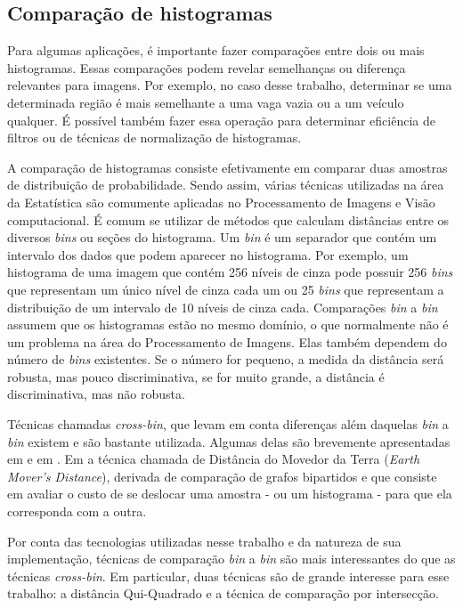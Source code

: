     \subsection{Comparação de histogramas} \label{comparacaoHistogramas}

        Para algumas aplicações, é importante fazer comparações entre dois ou mais histogramas. Essas comparações podem revelar semelhanças ou diferença relevantes para imagens. Por exemplo, no caso desse trabalho, determinar se uma determinada região é mais semelhante a uma vaga vazia ou a um veículo qualquer. É possível também fazer essa operação para determinar eficiência de filtros ou de técnicas de normalização de histogramas.

        A comparação de histogramas consiste efetivamente em comparar duas amostras de distribuição de probabilidade. Sendo assim, várias técnicas utilizadas na área da Estatística são comumente aplicadas no Processamento de Imagens e Visão computacional. É comum se utilizar de métodos que calculam distâncias entre os diversos \textit{bins} ou seções do histograma. Um \textit{bin} é um separador que contém um intervalo dos dados que podem aparecer no histograma. Por exemplo, um histograma de uma imagem que contém 256 níveis de cinza pode possuir 256 \textit{bins} que representam um único nível de cinza cada um ou 25 \textit{bins} que representam a distribuição de um intervalo de 10 níveis de cinza cada. Comparações \textit{bin} a \textit{bin} assumem que os histogramas estão no mesmo domínio, o que normalmente não é um problema na área do Processamento de Imagens. Elas também dependem do número de \textit{bins} existentes. Se o número for pequeno, a medida da distância será robusta, mas pouco discriminativa, se for muito grande, a distância é discriminativa, mas não robusta.\cite{pele2010quadratic}

        Técnicas chamadas \textit{cross-bin}, que levam em conta diferenças além daquelas \textit{bin} a \textit{bin} existem e são bastante utilizada. Algumas delas são brevemente apresentadas em \cite{zhang2014comparison} e em \cite{rubner2000earth}. Em \cite{rubner2000earth} a técnica chamada de Distância do Movedor da Terra (\textit{Earth Mover's Distance}), derivada de comparação de grafos bipartidos e que consiste em avaliar o custo de se deslocar uma amostra - ou um histograma  - para que ela corresponda com a outra.

        Por conta das tecnologias utilizadas nesse trabalho e da natureza de sua implementação, técnicas de comparação \textit{bin} a \textit{bin} são mais interessantes do que as técnicas \textit{cross-bin}. Em particular, duas técnicas são de grande interesse para esse trabalho: a distância Qui-Quadrado e a técnica de comparação por intersecção.

